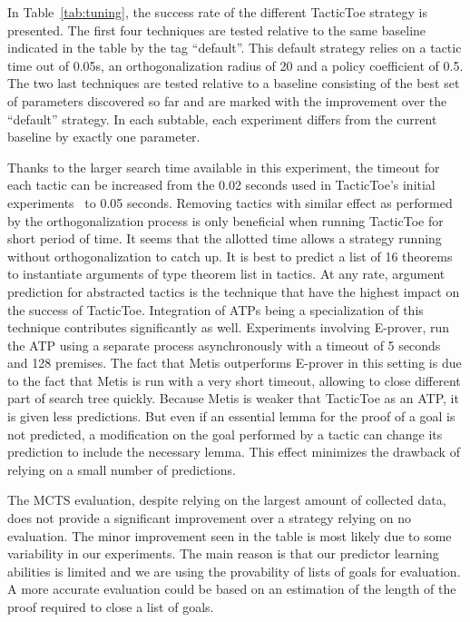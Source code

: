 \documentclass[runningheads,a4paper,draft]{svjour3}
\def\eprover{\textsf{E-prover}\xspace}
\def\metis{\textsf{Metis}\xspace}
\def\tactictoe{\textsf{TacticToe}\xspace}
\begin{document}
In Table~\ref{tab:tuning}, the success rate of the different \tactictoe
strategy is presented.
The first four techniques are tested relative to the same baseline indicated in
the table by the tag ``default''.  This default strategy relies on a tactic
time out of 0.05s, an orthogonalization radius of 20 and a policy coefficient of
0.5.
The two last techniques are tested relative
to a baseline consisting of the best set of parameters discovered so far and
are marked with the improvement over the ``default'' strategy.
In each subtable, each experiment differs from the current baseline by exactly
one parameter.

Thanks to the larger search time available in this experiment, the timeout for
each tactic can be increased from the 0.02 seconds used in \tactictoe's initial
experiments~\cite{tgckju-lpar17} to 0.05
seconds. Removing tactics with similar effect as performed by the
orthogonalization process is only beneficial when running \tactictoe for short
period of time. It seems that the allotted time allows a strategy
running without orthogonalization to catch up.
It is best to predict a list of 16 theorems to instantiate arguments of type
theorem list in tactics. At any rate, argument prediction for abstracted
tactics is the technique that have the highest impact on the success of
\tactictoe. Integration of ATPs being a specialization of this technique
contributes significantly as well. Experiments involving \eprover, run the ATP
using a separate process asynchronously with a timeout of 5 seconds and 128 premises.
The fact that \metis outperforms \eprover in this setting is due to the fact
that \metis is run with a very short timeout, allowing to close different part
of search tree quickly. Because \metis is weaker that \tactictoe as an ATP, it
is given less predictions. But even if an essential lemma for the proof of a
goal is not predicted, a modification on the goal performed by a tactic can
change its prediction to include the necessary lemma.
This effect minimizes the drawback of relying on a small number of predictions.

The MCTS evaluation, despite relying on the largest amount of collected data,
does not provide a significant improvement over a strategy relying on no
evaluation. The minor improvement seen in the table is most likely due to some
variability in our experiments.
The main reason is that our predictor learning abilities is
limited and we are using the provability of lists of goals for evaluation. A
more accurate evaluation could be based on an estimation of the length of the
proof required to close a list of goals.
\end{document}
